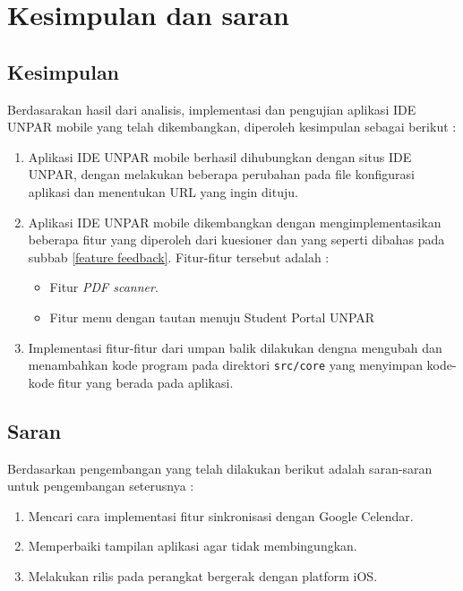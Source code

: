 \chapter{Kesimpulan dan saran}

\section{Kesimpulan}

Berdasarakan hasil dari analisis, implementasi dan pengujian aplikasi IDE UNPAR mobile yang telah dikembangkan, diperoleh kesimpulan sebagai berikut :

\begin{enumerate}
\item Aplikasi IDE UNPAR mobile berhasil dihubungkan dengan situs IDE UNPAR, dengan melakukan beberapa perubahan pada file konfigurasi aplikasi dan menentukan URL yang ingin dituju.

\item Aplikasi IDE UNPAR mobile dikembangkan dengan mengimplementasikan beberapa fitur yang diperoleh dari kuesioner dan yang seperti dibahas pada subbab \ref{feature feedback}. Fitur-fitur tersebut adalah :
	\begin{itemize}
		\item Fitur \textit{PDF scanner}.
		\item  Fitur menu dengan tautan menuju Student Portal UNPAR
	\end{itemize}
	
\item Implementasi fitur-fitur dari umpan balik dilakukan dengna mengubah dan menambahkan kode program pada  direktori \texttt{src/core} yang menyimpan kode-kode fitur yang berada pada aplikasi. 
\end{enumerate}

\section{Saran}

Berdasarkan pengembangan yang telah dilakukan berikut adalah saran-saran untuk pengembangan seterusnya :

\begin{enumerate}
\item Mencari cara implementasi fitur sinkronisasi dengan Google Celendar.
\item Memperbaiki tampilan aplikasi agar tidak membingungkan. 
\item Melakukan rilis pada perangkat bergerak dengan platform iOS.

\end{enumerate}

